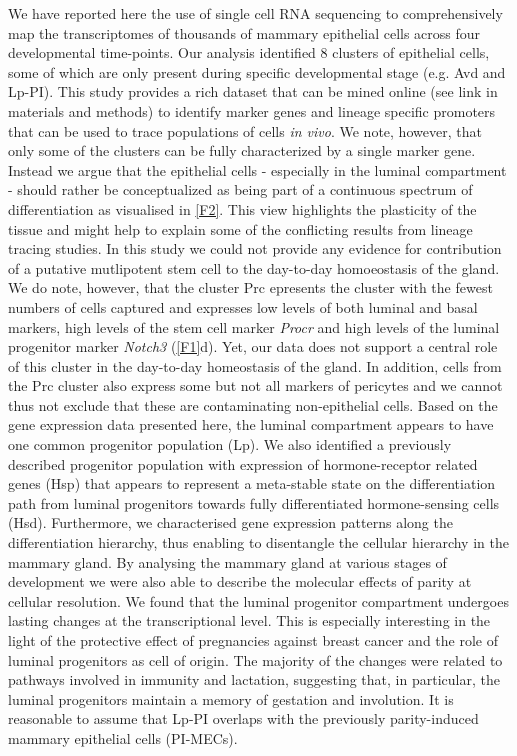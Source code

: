 \documentclass[titlepage, 12pt, oneside]{amsart}
\begin{document}
We have reported here the use of single cell RNA sequencing to comprehensively map the transcriptomes of thousands of mammary epithelial cells across four developmental time-points.
Our analysis identified 8 clusters of epithelial cells, some of which are only present during specific developmental stage (e.g. Avd and Lp-PI).
This study provides a rich dataset that can be mined online (see link in materials and methods) to identify marker genes and lineage specific promoters that can be used to trace populations of cells \textit{in vivo}.
We note, however, that only some of the clusters can be fully characterized by a single marker gene.
Instead we argue that the epithelial cells - especially in the luminal compartment - should rather be conceptualized as being part of a continuous spectrum of differentiation as visualised in \autoref{F2}.
This view highlights the plasticity of the tissue and might help to explain some of the conflicting results from lineage tracing studies\autocite{Inman2015}.
In this study we could not provide any evidence for contribution of a putative mutlipotent stem cell to the day-to-day homoeostasis of the gland.
We do note, however, that the cluster Prc epresents the cluster with the fewest numbers of cells captured and expresses low levels of both luminal and basal markers, high levels of the stem cell marker \textit{Procr}\autocite{Wang2015} and high levels of the luminal progenitor marker \textit{Notch3}\autocite{Lafkas2013} (\autoref{F1}d).
Yet, our data does not support a central role of this cluster in the day-to-day homeostasis of the gland. 
In addition, cells from the Prc cluster also express some but not all markers of pericytes and we cannot thus not exclude that these are contaminating non-epithelial cells. 
Based on the gene expression data presented here, the luminal compartment appears to have one common progenitor population (Lp).
We also identified a previously described progenitor population with expression of hormone-receptor related genes (Hsp) that appears to represent a meta-stable state on the differentiation path from luminal progenitors towards fully differentiated hormone-sensing cells (Hsd).
Furthermore, we characterised gene expression patterns along the differentiation hierarchy, thus enabling to disentangle the cellular hierarchy in the mammary gland.
By analysing the mammary gland at various stages of development we were also able to describe the molecular effects of parity at cellular resolution.
We found that the luminal progenitor compartment undergoes lasting changes at the transcriptional level.
This is especially interesting in the light of the protective effect of pregnancies against breast cancer and the role of luminal progenitors as cell of origin.
The majority of the changes were related to pathways involved in immunity and lactation, suggesting that, in particular, the luminal progenitors maintain a memory of gestation and involution.
It is reasonable to assume that Lp-PI overlaps with the previously parity-induced mammary epithelial cells (PI-MECs)\autocite{Wagner2002}.
\end{document}
